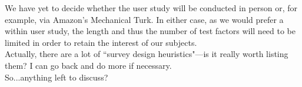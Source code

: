 \documentclass[12pt, twocolumn]{article}
\begin{document}
We have yet to decide whether the user study will be conducted in person or, for example, via Amazon's Mechanical Turk. 
In either case, as we would prefer a within user 
study, the length and thus the number of test factors will need to be limited in order to retain the interest of our subjects. \\
Actually, there are a lot of ``survey design heuristics"---is it really worth listing them? I can go back and do more if necessary.
\\

So...anything left to discuss?










\end{document}
